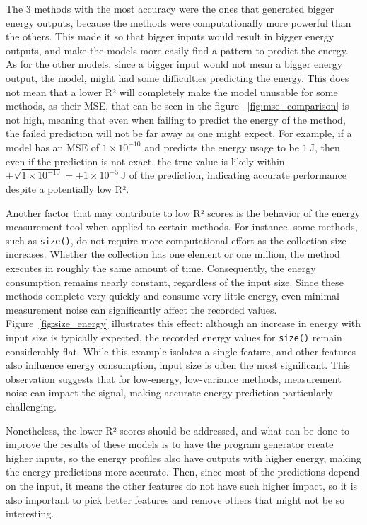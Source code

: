 The 3 methods with the most accuracy were the ones that generated bigger energy outputs, because the methods were computationally more powerful than the others. This made it so that bigger inputs would result in bigger energy outputs, and make the models more easily find a pattern to predict the energy. As for the other models, since a bigger input would not mean a bigger energy output, the model, might had some difficulties predicting the energy. This does not mean that a lower R² will completely make the model unusable for some methods, as their MSE, that can be seen in the figure ~\ref{fig:mse_comparison} is not high, meaning that even when failing to predict the energy of the method, the failed prediction will not be far away as one might expect. For example, if a model has an MSE of $1 \times 10^{-10}$ and predicts the energy usage to be $1~\mathrm{J}$, then even if the prediction is not exact, the true value is likely within $\pm \sqrt{1 \times 10^{-10}} = \pm 1 \times 10^{-5}~\mathrm{J}$ of the prediction, indicating accurate performance despite a potentially low R². 

Another factor that may contribute to low R² scores is the behavior of the energy measurement tool when applied to certain methods. For instance, some methods, such as \texttt{size()}, do not require more computational effort as the collection size increases. Whether the collection has one element or one million, the method executes in roughly the same amount of time. Consequently, the energy consumption remains nearly constant, regardless of the input size. Since these methods complete very quickly and consume very little energy, even minimal measurement noise can significantly affect the recorded values. Figure~\ref{fig:size_energy} illustrates this effect: although an increase in energy with input size is typically expected, the recorded energy values for \texttt{size()} remain considerably flat. While this example isolates a single feature, and other features also influence energy consumption, input size is often the most significant. This observation suggests that for low-energy, low-variance methods, measurement noise can impact the signal, making accurate energy prediction particularly challenging.


Nonetheless, the lower R² scores should be addressed, and what can be done to improve the results of these models is to have the program generator create higher inputs, so the energy profiles also have outputs with higher energy, making the energy predictions more accurate. Then, since most of the predictions depend on the input, it means the other features do not have such higher impact, so it is also important to pick better features and remove others that might not be so interesting. 




